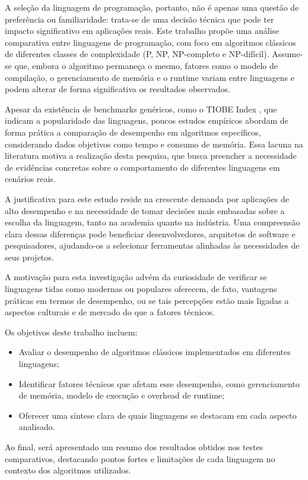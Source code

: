 \documentclass[12pt,oneside,a4paper]{report}
\begin{document}
A seleção da linguagem de programação, portanto, não é apenas uma questão de preferência ou familiaridade: trata-se de uma decisão técnica que pode ter impacto significativo em aplicações reais. Este trabalho propõe uma análise comparativa entre linguagens de programação, com foco em algoritmos clássicos de diferentes classes de complexidade (P, NP, NP-completo e NP-difícil). Assume-se que, embora o algoritmo permaneça o mesmo, fatores como o modelo de compilação, o gerenciamento de memória e o runtime variam entre linguagens e podem alterar de forma significativa os resultados observados.

Apesar da existência de benchmarks genéricos, como o TIOBE Index \cite{tiobe}, que indicam a popularidade das linguagens, poucos estudos empíricos abordam de forma prática a comparação de desempenho em algoritmos específicos, considerando dados objetivos como tempo e consumo de memória. Essa lacuna na literatura motiva a realização desta pesquisa, que busca preencher a necessidade de evidências concretas sobre o comportamento de diferentes linguagens em cenários reais.

A justificativa para este estudo reside na crescente demanda por aplicações de alto desempenho e na necessidade de tomar decisões mais embasadas sobre a escolha da linguagem, tanto na academia quanto na indústria. Uma compreensão clara dessas diferenças pode beneficiar desenvolvedores, arquitetos de software e pesquisadores, ajudando-os a selecionar ferramentas alinhadas às necessidades de seus projetos.

A motivação para esta investigação advém da curiosidade de verificar se linguagens tidas como modernas ou populares oferecem, de fato, vantagens práticas em termos de desempenho, ou se tais percepções estão mais ligadas a aspectos culturais e de mercado do que a fatores técnicos.

Os objetivos deste trabalho incluem:
\begin{itemize}
\item Avaliar o desempenho de algoritmos clássicos implementados em diferentes linguagens;
\item Identificar fatores técnicos que afetam esse desempenho, como gerenciamento de memória, modelo de execução e overhead de runtime;
\item Oferecer uma síntese clara de quais linguagens se destacam em cada aspecto analisado.
\end{itemize}

Ao final, será apresentado um resumo dos resultados obtidos nos testes comparativos, destacando pontos fortes e limitações de cada linguagem no contexto dos algoritmos utilizados.
\end{document}
